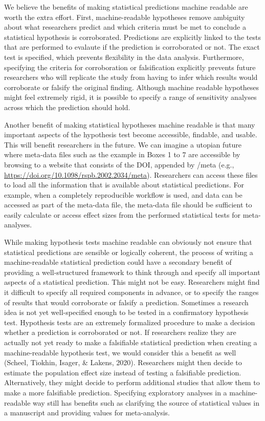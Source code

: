 \documentclass[
  english,
  doc,floatsintext]{apa6}
\begin{document}
We believe the benefits of making statistical predictions machine readable are worth the extra effort. First, machine-readable hypotheses remove ambiguity about what researchers predict and which criteria must be met to conclude a statistical hypothesis is corroborated. Predictions are explicitly linked to the tests that are performed to evalaute if the prediction is corroborated or not. The exact test is specified, which prevents flexibility in the data analysis. Furthermore, specifying the criteria for corroboration or falsification explicitly prevents future researchers who will replicate the study from having to infer which results would corroborate or falsify the original finding. Although machine readable hypotheses might feel extremely rigid, it is possible to specify a range of sensitivity analyses across which the prediction should hold.

Another benefit of making statistical hypotheses machine readable is that many important aspects of the hypothesis test become accessible, findable, and usable. This will benefit researchers in the future. We can imagine a utopian future where meta-data files such as the example in Boxes 1 to 7 are accessible by browsing to a website that consists of the DOI, appended by /meta (e.g., \url{https://doi.org/10.1098/rspb.2002.2034/meta}). Researchers can access these files to load all the information that is available about statistical predictions. For example, when a completely reproducible workflow is used, and data can be accessed as part of the meta-data file, the meta-data file should be sufficient to easily calculate or access effect sizes from the performed statistical tests for meta-analyses.

While making hypothesis tests machine readable can obviously not ensure that statistical predictions are sensible or logically coherent, the process of writing a machine-readable statistical prediction could have a secondary benefit of providing a well-structured framework to think through and specify all important aspects of a statistical prediction. This might not be easy. Researchers might find it difficult to specify all required components in advance, or to specify the ranges of results that would corroborate or falsify a prediction. Sometimes a research idea is not yet well-specified enough to be tested in a confirmatory hypothesis test. Hypothesis tests are an extremely formalized procedure to make a decision whether a prediction is corroborated or not. If researchers realize they are actually not yet ready to make a falsifiable statistical prediction when creating a machine-readable hypothesis test, we would consider this a benefit as well (Scheel, Tiokhin, Isager, \& Lakens, 2020). Researchers might then decide to estimate the population effect size instead of testing a falsifiable prediction. Alternatively, they might decide to perform additional studies that allow them to make a more falsifiable prediction. Specifying exploratory analyses in a machine-readable way still has benefits such as clarifying the source of statistical values in a manuscript and providing values for meta-analysis.
\end{document}
